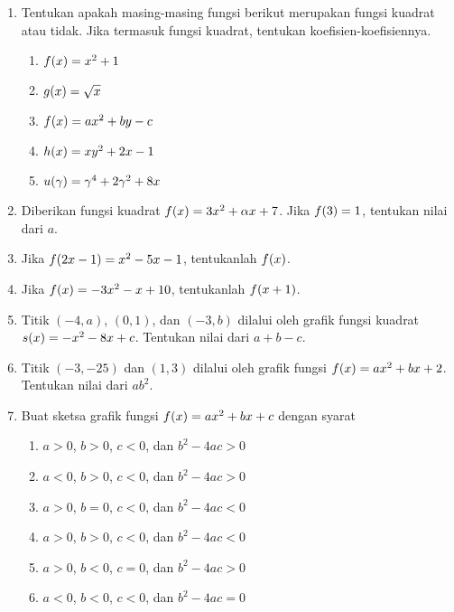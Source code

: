 		\begin{enumerate}[topsep=0pt]
			\item Tentukan apakah masing-masing fungsi berikut merupakan fungsi kuadrat atau tidak. Jika termasuk fungsi kuadrat, tentukan koefisien-koefisiennya.
			\begin{multcols}
				\begin{enumerate}
					\item $ \mathop{}\!{f}{\left({x}\right)} = x^{2} + 1 $
					\item $ \mathop{}\!{g}{\left({x}\right)} = \sqrt{x} $
					\item $ \mathop{}\!{f}{\left({x}\right)} = ax^{2} + by - c $
					\item $ \mathop{}\!{h}{\left({x}\right)} = xy^{2} + 2x - 1 $
					\item $ \mathop{}\!{u}{\left({\gamma}\right)} = \gamma^{4} + 2\gamma^{2} + 8x $
				\end{enumerate}
			\end{multcols}
			\item Diberikan fungsi kuadrat $ \mathop{}\!{f}{\left({x}\right)} = 3x^{2} + \alpha x + 7 $. Jika $ \mathop{}\!{f}{\left({3}\right)} = 1 $, tentukan nilai dari $ a $.
			\item Jika $ \mathop{}\!{f}{\left({2x - 1}\right)} = x^{2} - 5x - 1 $, tentukanlah $ \mathop{}\!{f}{\left({x}\right)} $.
			\item Jika $ \mathop{}\!{f}{\left({x}\right)} = -3x^{2} - x + 10 $, tentukanlah $ \mathop{}\!{f}{\left({x + 1}\right)} $.
			\item Titik $ \left(-4, a\right) $, $ \left(0, 1\right) $, dan $ \left(-3, b\right) $ dilalui oleh grafik fungsi kuadrat $ \mathop{}\!{s}{\left({x}\right)} = -x^{2} - 8x + c $. Tentukan nilai dari $ a + b - c $.
			\item Titik $ \left(-3, -25\right) $ dan $ \left(1, 3\right) $ dilalui oleh grafik fungsi $ \mathop{}\!{f}{\left({x}\right)} = ax^{2} + bx + 2 $. Tentukan nilai dari $ ab^{2} $.
			\item Buat sketsa grafik fungsi $ \mathop{}\!{f}{\left({x}\right)} = ax^{2} + bx + c $ dengan syarat
			\begin{enumerate}
				\item $ a > 0 $, $ b > 0 $, $ c < 0 $, dan $ b^{2} - 4ac > 0 $
				\item $ a < 0 $, $ b > 0 $, $ c < 0 $, dan $ b^{2} - 4ac > 0 $
				\item $ a > 0 $, $ b = 0 $, $ c < 0 $, dan $ b^{2} - 4ac < 0 $
				\item $ a > 0 $, $ b > 0 $, $ c < 0 $, dan $ b^{2} - 4ac < 0 $
				\item $ a > 0 $, $ b < 0 $, $ c = 0 $, dan $ b^{2} - 4ac > 0 $
				\item $ a < 0 $, $ b < 0 $, $ c < 0 $, dan $ b^{2} - 4ac = 0 $

\end{enumerate}
\end{enumerate}
